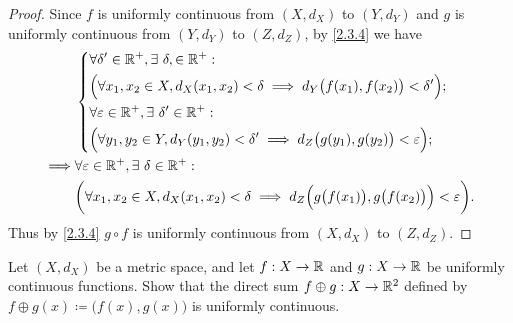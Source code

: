 \begin{proof}
  Since \(f\) is uniformly continuous from \((X, d_X)\) to \((Y, d_Y)\) and \(g\) is uniformly continuous from \((Y, d_Y)\) to \((Z, d_Z)\), by \cref{2.3.4} we have
  \begin{align*}
             & \begin{dcases}
                 \forall \delta' \in \mathbb{R}^+, \exists\ \delta, \in \mathbb{R}^+ :                                                    \\
                 \Big(\forall x_1, x_2 \in X, d_X(x_1, x_2) < \delta \implies d_Y\big(f(x_1), f(x_2)\big) < \delta'\Big); \\
                 \forall \varepsilon \in \mathbb{R}^+, \exists\ \delta' \in \mathbb{R}^+ :                                                \\
                 \Big(\forall y_1, y_2 \in Y, d_Y(y_1, y_2) < \delta' \implies d_Z\big(g(y_1), g(y_2)\big) < \varepsilon\Big);
               \end{dcases}                         \\
    \implies & \forall \varepsilon \in \mathbb{R}^+, \exists\ \delta \in \mathbb{R}^+ :                                                                             \\
             & \bigg(\forall x_1, x_2 \in X, d_X(x_1, x_2) < \delta \implies d_Z\Big(g\big(f(x_1)\big), g\big(f(x_2)\big)\Big) < \varepsilon\bigg).
  \end{align*}
  Thus by \cref{2.3.4} \(g \circ f\) is uniformly continuous from \((X, d_X)\) to \((Z, d_Z)\).
\end{proof}

\begin{ex}\label{ex:2.3.5}
  Let \((X, d_X)\) be a metric space, and let \(f : X \to \mathbb{R}\) and \(g : X \to \mathbb{R}\) be uniformly continuous functions.
  Show that the direct sum \(f \oplus g : X \to \mathbb{R}^2\) defined by \(f \oplus g(x) \coloneqq \big(f(x), g(x)\big)\) is uniformly continuous.
\end{ex}

